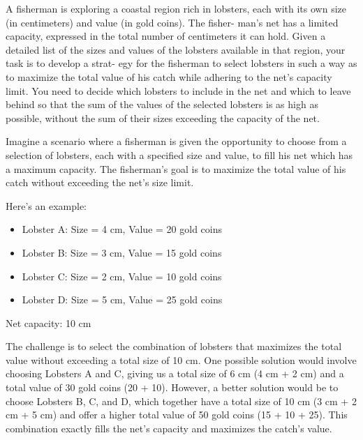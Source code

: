 \documentclass{article}%
\begin{document}
        \begin{Large}
        A fisherman is exploring a coastal region rich in lobsters, each with
        its own size (in centimeters) and value (in gold coins). The fisher-
        man’s net has a limited capacity, expressed in the total number of
        centimeters it can hold. Given a detailed list of the sizes and values
        of the lobsters available in that region, your task is to develop a strat-
        egy for the fisherman to select lobsters in such a way as to maximize
        the total value of his catch while adhering to the net’s capacity limit.
        You need to decide which lobsters to include in the net and which
        to leave behind so that the sum of the values of the selected lobsters
        is as high as possible, without the sum of their sizes exceeding the
        capacity of the net.
        
        \vspace{0.3cm}
        Imagine a scenario where a fisherman is given the opportunity to
        choose from a selection of lobsters, each with a specified size and
        value, to fill his net which has a maximum capacity. The fisherman’s
        goal is to maximize the total value of his catch without exceeding the
        net’s size limit.

        \vspace{0.3cm}
        Here’s an example:
        \begin{itemize}
            \item Lobster A: Size = 4 cm, Value = 20 gold coins
            \item Lobster B: Size = 3 cm, Value = 15 gold coins
            \item Lobster C: Size = 2 cm, Value = 10 gold coins
            \item Lobster D: Size = 5 cm, Value = 25 gold coins
        \end{itemize}
        Net capacity: 10 cm
                        
        \vspace{0.6cm}                
        The challenge is to select the combination of lobsters that maximizes the total value without exceeding a total size of 10 cm.
        One possible solution would involve choosing Lobsters A and C,
        giving us a total size of 6 cm (4 cm + 2 cm) and a total value of 30
        gold coins (20 + 10). However, a better solution would be to choose
        Lobsters B, C, and D, which together have a total size of 10 cm (3
        cm + 2 cm + 5 cm) and offer a higher total value of 50 gold coins
        (15 + 10 + 25). This combination exactly fills the net’s capacity and
        maximizes the catch’s value.
        \end{Large}
        \vspace*{\fill}
\newpage%
\end{document}
